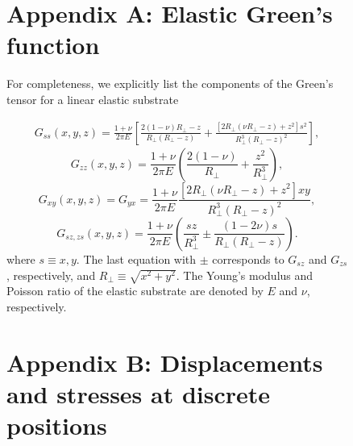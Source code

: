 \documentclass[aps,prl,reprint,twocolumn,groupedaddress,showpacs]{revtex4}
\begin{document}
\begin{figure}





\clearpage
\newpage 

\appendix
\begin{widetext}
\section{Appendix A: Elastic Green's function}

For completeness, we explicitly list the components of the Green's tensor 
for a linear elastic substrate \cite{LANDAU}

%
\begin{align}
G_{ss}(x,y,z) = \frac{1+\nu}{2\pi E}\left[\frac{2(1-\nu)R_{\perp}-z}{R_{\perp}(R_{\perp}-z)} + 
\frac{[2R_{\perp}(\nu R_{\perp}-z)+z^{2}]s^{2}}{R_{\perp}^{3}(R_{\perp}-z)^{2}}\right],
\end{align}
\begin{equation}
G_{zz}(x,y,z) =\frac{1+\nu}{2\pi E}\left(\frac{2(1-\nu)}
{R_{\perp}}+\frac{z^{2}}{R_{\perp}^{3}}\right),
\label{eq:Gzz0}
\end{equation}
\begin{equation} 
G_{xy}(x,y,z) = G_{yx}=\frac{1+\nu}{2\pi E}\frac{[2R_{\perp}(\nu R_{\perp}-z)+z^{2}]xy}{R_{\perp}^{3}
(R_{\perp}-z)^{2}},
\label{eq:Gxy0}
\end{equation}
\begin{equation}
G_{sz, zs}(x,y,z) =\frac{1+\nu}{2\pi E}\left(\frac{sz}{R_{\perp}^{3}}\pm\frac{(1-2\nu)s}{R_{\perp}
(R_{\perp}-z)}\right).
\end{equation}
%
where $s\equiv x,y$. The last equation with $\pm$ corresponds to
$G_{sz}$ and $G_{zs}$, respectively, and $R_{\perp} \equiv \sqrt{x^{2}
  +y^{2}}$. The Young's modulus and Poisson ratio of the elastic
substrate are denoted by $E$ and $\nu$, respectively.

\section{Appendix B: Displacements and stresses at discrete positions}


\end{widetext}
\end{figure}
\end{document}
